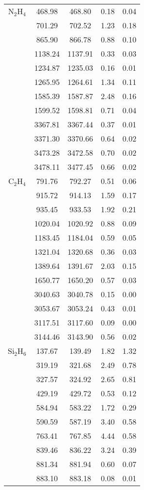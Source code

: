\documentclass[journal=jpca,manuscript=article]{achemso}
\begin{document}
\begin{table}
{\begin{tabular}{c| c c c c }
N$_2$H$_4$ & 468.98 & 468.80 & 0.18 & 0.04 \\
 & 701.29 & 702.52 & 1.23 & 0.18 \\
 & 865.90 & 866.78 & 0.88 & 0.10 \\
 & 1138.24 & 1137.91 & 0.33 & 0.03 \\
 & 1234.87 & 1235.03 & 0.16 & 0.01 \\
 & 1265.95 & 1264.61 & 1.34 & 0.11 \\
 & 1585.39 & 1587.87 & 2.48 & 0.16 \\
 & 1599.52 & 1598.81 & 0.71 & 0.04 \\
 & 3367.81 & 3367.44 & 0.37 & 0.01 \\
 & 3371.30 & 3370.66 & 0.64 & 0.02 \\
 & 3473.28 & 3472.58 & 0.70 & 0.02 \\
 & 3478.11 & 3477.45 & 0.66 & 0.02 \\ 
C$_2$H$_4$ & 791.76 & 792.27 & 0.51 & 0.06 \\
 & 915.72 & 914.13 & 1.59 & 0.17 \\
 & 935.45 & 933.53 & 1.92 & 0.21 \\
 & 1020.04 & 1020.92 & 0.88 & 0.09 \\
 & 1183.45 & 1184.04 & 0.59 & 0.05 \\
 & 1321.04 & 1320.68 & 0.36 & 0.03 \\
 & 1389.64 & 1391.67 & 2.03 & 0.15 \\
 & 1650.77 & 1650.20 & 0.57 & 0.03 \\
 & 3040.63 & 3040.78 & 0.15 & 0.00 \\
 & 3053.67 & 3053.24 & 0.43 & 0.01 \\
 & 3117.51 & 3117.60 & 0.09 & 0.00 \\
 & 3144.46 & 3143.90 & 0.56 & 0.02 \\
Si$_2$H$_6$ & 137.67 & 139.49 & 1.82 & 1.32 \\
& 319.19 & 321.68 & 2.49 & 0.78 \\
& 327.57 & 324.92 & 2.65 & 0.81 \\
& 429.19 & 429.72 & 0.53 & 0.12 \\
& 584.94 & 583.22 & 1.72 & 0.29 \\
& 590.59 & 587.19 & 3.40 & 0.58 \\
& 763.41 & 767.85 & 4.44 & 0.58 \\
& 839.46 & 836.22 & 3.24 & 0.39 \\
& 881.34 & 881.94 & 0.60 & 0.07 \\
& 883.10 & 883.18 & 0.08 & 0.01 \\

\end{tabular}}
\end{table}
\end{document}
